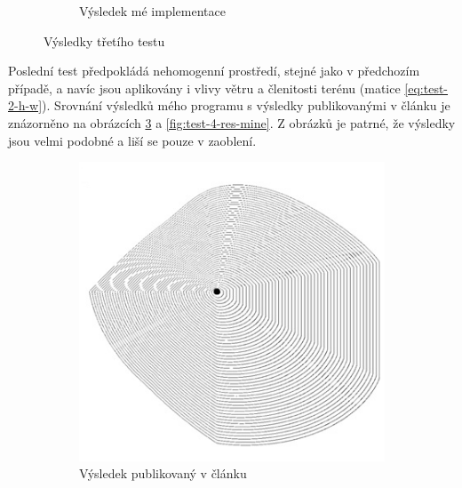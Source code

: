 \documentclass[11pt,a4paper]{scrartcl}
\begin{document}
\begin{figure}[H]
\begin{subfigure} {0.3 \textwidth}
			\caption{Výsledek mé implementace}
			\label{fig:test-3-res-mine}
		\end{subfigure}
		
		\caption{Výsledky třetího testu}
		\label{fig:test-3-res}
	\end{figure}

	Poslední test předpokládá nehomogenní prostředí, stejné jako v předchozím případě, a navíc jsou aplikovány i vlivy větru a členitosti terénu (matice \ref{eq:test-2-h-w}). Srovnání výsledků mého programu s výsledky publikovanými v článku je znázorněno na obrázcích \ref{fig:test-4-res-art} a \ref{fig:test-4-res-mine}. Z obrázků je patrné, že výsledky jsou velmi podobné a liší se pouze v zaoblení.
	
	\begin{figure}[H]
		\centering
		\begin{subfigure} {0.3 \textwidth}
			\includegraphics[width=\linewidth]{art-inhomogeneous-wh}
			\caption{Výsledek publikovaný v článku}
			\label{fig:test-4-res-art}
		\end{subfigure}
		\hspace*{0.1 \textwidth}
		\begin{subfigure} {0.3 \textwidth}

\end{subfigure}
\end{figure}
\end{document}
